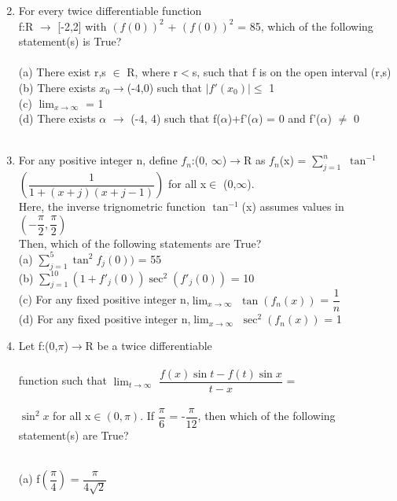 \documentclass[journal,12pt,onecoloumn]{IEEEtran}
\begin{document}
\begin{enumerate}[label=\arabic*]
\begin{itemize}
\begin{multicols}{2}
	\end{multicols}
	\end{itemize}
	\item For every twice differentiable function\\
	 f:R $\to$ [-2,2] with $(f(0))^2$ + $(f(0))^2$ = 85, which of the following statement(s) is True?\\
	 \\
	(a) There exist r,s $\in$ R, where r$<$s, such that f is on the open interval (r,s)\\
	(b) There exists $x_0\to$(-4,0) such that $|f'(x_0)|\leq$ 1 \\
	(c) $\displaystyle{\lim_{x \to \infty}}$ = 1\\
	(d) There exists $\alpha$ $\to$ (-4, 4) such that f($\alpha$)+f'($\alpha$) = 0 and f'($\alpha$) $\neq$ 0\\
	\\
	\item For any positive integer n, define $f_n$:(0, $\infty$)$\to$R as $f_n$(x) = $\sum\limits_{j = 1}^n$ $\tan^{-1}$ $\left(\dfrac{1}{1+(x+j)(x+j-1)}\right)$ for all x$\in$ (0,$\infty$).\\
	Here, the inverse trignometric function $\tan^{-1}$(x) assumes values in $\left(-\dfrac{\pi}{2}, \dfrac{\pi}{2}\right)$\\
	Then, which of the following statements are True?\\
	(a) $\sum\limits_{j=1}^5 \tan^2 f_j(0))$ = 55\\
	(b) $\sum\limits_{j=1}^{10} (1+f'_j(0))\sec^2(f'_j(0))$ = 10\\
	(c) For any fixed positive integer n,$\displaystyle{\lim_{x \to \infty}}$ $\tan (f_n(x))$ = $\dfrac{1}{n}$\\
	(d)  For any fixed positive integer n,$\displaystyle{\lim_{x \to \infty}}$ $\sec^2 (f_n(x))$ = 1 
	\item Let f:(0,$\pi$)$\to$R be a twice differentiable \\
	\\
	function such that $\displaystyle{\lim_{t \to \infty}}$ $\dfrac{f(x)\sin t-f(t)\sin x}{t-x}$ = \\
	\\
	$\sin^2x$ for all x$\in(0,\pi)$. If $\dfrac{\pi}{6}$ = -$\dfrac{\pi}{12}$, then which of the following statement(s)  are True?\\
	\\
	\item [(a)] f$\left(\dfrac{\pi}{4}\right)$ = $\dfrac{\pi}{4\sqrt{2}}$\\
	

\end{enumerate}
\end{document}
